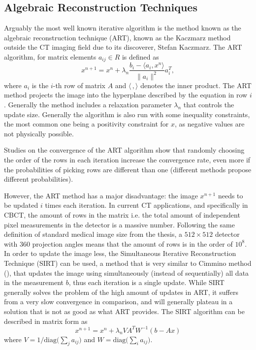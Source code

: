 \subsection{Algebraic Reconstruction Techniques}

Arguably the most well known iterative algorithm is the method known as the algebraic reconstruction technique (ART)\cite{K-1937}, known as the Kaczmarz method outside the CT imaging field due to its discoverer, Stefan Kaczmarz. The ART algorithm, for matrix elements $a_{ij}\in R$ is defined as
\begin{equation}
x^{n+1}=x^n+\lambda_n\frac{b_i-\langle a_i,x^n\rangle}{\lVert{a_i}\rVert^2}a_i^T,
\end{equation}
where $a_i$ is the $i$-th row of matrix $A$ and $\langle \,, \rangle$ denotes the inner product. The ART method projects the image into the hyperplane described by the equation in row $i$. Generally the method includes a relaxation parameter $\lambda_n$ that controls the update size. Generally the algorithm is also run with some inequality constraints, the most common one being a positivity constraint for $x$, as negative values are not physically possible.

Studies on the convergence of the ART algorithm show\cite{herman1993algebraic} that randomly choosing the order of the rows in each iteration increase the convergence rate, even more if the probabilities of picking rows are different than one (different methods propose different probabilities)\cite{strohmer2009randomized}\cite{liu2016accelerated}. 

However, the ART method has a major disadvantage: the image $x^{n+1}$ needs to be updated $i$ times each iteration. In current CT applications, and specifically in CBCT, the amount of rows in the matrix i.e. the total amount of independent pixel measurements in the detector is a massive number. Following the same definition of standard medical image size from the thesis, a $512\times512$ detector with 360 projection angles means that the amount of rows is in the order of $10^8$. In order to update the image less, the Simultaneous Iterative Reconstruction Technique (SIRT)\cite{SIRT} can be used, a method that is very similar to Cimmino method\cite{cimmino1938cacolo} (), that updates the image using simultaneously (instead of sequentially) all data in the measurement $b$, thus each iteration is a single update. While SIRT generally solves the problem of the high amount of updates in ART, it suffers from a very slow convergence in comparison, and will generally plateau in a solution that is not as good as what ART provides. The SIRT algorithm can be described in matrix form as
\begin{equation}
x^{n+1}=x^n+\lambda_n V A^T W^{-1}\left(b-Ax\right) \label{eq:SIRT}
\end{equation}
where $V=1/\text{diag}\bigl({\sum_j a_{ij}}\bigr)$ and  $W=\text{diag}\bigl({\sum_i a_{ij}}\bigr)$.

